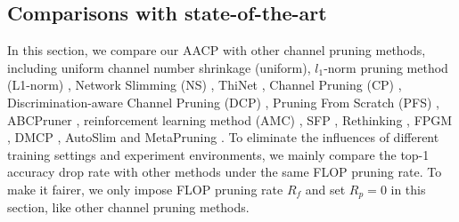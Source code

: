 \documentclass[final]{cvpr}
\begin{document}
\subsection{Comparisons with state-of-the-art}

In this section, we compare our AACP with other channel pruning methods, including uniform channel number shrinkage (uniform), 
$l_1$-norm pruning method (L1-norm) \cite{li2016pruning}, Network Slimming (NS) \cite{liu2017learning},
ThiNet \cite{luo2017thinet}, Channel Pruning (CP) \cite{he2017channel}, Discrimination-aware Channel Pruning (DCP) \cite{zhuang2018discrimination},
Pruning From Scratch (PFS) \cite{wang2019pruning}, ABCPruner \cite{lin2020channel}, reinforcement learning method (AMC) \cite{he2018amc}, 
SFP \cite{he2018soft}, Rethinking \cite{liu2018rethinking}, FPGM \cite{he2019filter}, DMCP \cite{guo2020dmcp}, AutoSlim \cite{yu2019autoslim} and 
MetaPruning \cite{liu2019metapruning}. To eliminate the influences of different training settings and experiment environments, we mainly compare the top-1 accuracy drop rate with other methods 
under the same FLOP pruning rate. To make it fairer, we only impose FLOP pruning rate $R_f$ and set $R_p=0$ in this section, like other channel pruning methods. 
\end{document}
